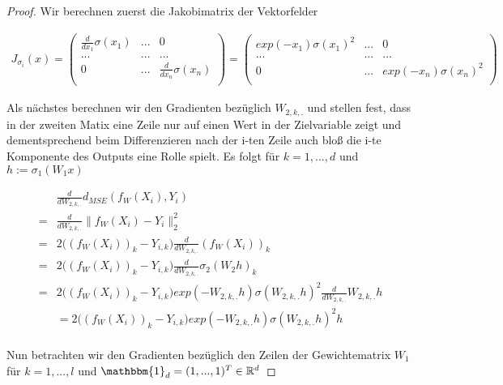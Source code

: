 \documentclass[a4paper,12pt]{article}
\newcommand{\R}{\mathbb{R}}
\begin{document}
\begin{proof}

    Wir berechnen zuerst die Jakobimatrix der Vektorfelder

    \begin{align*}
        J_{\sigma_i}(x) = \begin{pmatrix}
            \frac{d}{dx_1} \sigma(x_1) & ... & 0\\
            ...& ... & ... \\
            0& ... & \frac{d}{dx_n} \sigma(x_n) \\
        \end{pmatrix}
        = \begin{pmatrix}
            exp(-x_1) \sigma(x_1)^2 & ... & 0\\
            ...& ... & ... \\
            0& ... & exp(-x_n) \sigma(x_n)^2 \\
        \end{pmatrix}
    \end{align*}

    Als nächstes berechnen wir den Gradienten bezüglich $W_{2,k,.}$ und stellen fest, dass in der zweiten Matix eine Zeile nur auf einen Wert in der Zielvariable zeigt und dementsprechend beim Differenzieren nach der i-ten Zeile auch bloß die i-te Komponente des Outputs eine Rolle spielt. Es folgt für $k = 1,...,d$ und $ h:= \sigma_1(W_1 x)$

    \begin{align*}
        & \frac{d}{d W_{2,k,.}} d_{MSE}(f_W(X_i), Y_i) \\
        = & \frac{d}{d W_{2,k,.}} \|f_W(X_i) - Y_i \|_2^2 \\
        = & 2\bigl((f_W(X_i))_k - Y_{i,k} \bigl) \frac{d}{d W_{2,k,.}} (f_W(X_i))_k \\
        = & 2\bigl((f_W(X_i))_k - Y_{i,k} \bigl) \frac{d}{d W_{2,k,.}} \sigma_2(W_2 h)_k \\
        = & 2\bigl((f_W(X_i))_k - Y_{i,k} \bigl) exp(-W_{2,k,.} h) \sigma(W_{2,k,.} h)^2 \frac{d}{d W_{2,k,.}} W_{2,k,.} h \\
        & = 2\bigl((f_W(X_i))_k - Y_{i,k} \bigl) exp(-W_{2,k,.} h) \sigma(W_{2,k,.} h)^2 h \\
    \end{align*}

    Nun betrachten wir den Gradienten bezüglich den Zeilen der Gewichtematrix $W_1$ für $k = 1,..., l$ und $\mathbbm{1}_d = (1,...,1)^T \in \R^d$


\end{proof}
\end{document}
